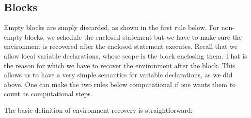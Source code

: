 \documentclass{article}
\begin{document}
\begin{kdefinition}
\begin{module}{}
\begin{kblock}[text]
 \subsection{Blocks}
Empty blocks are simply discarded, as shown in the first rule below.
For non-empty blocks, we schedule the enclosed statement but we have to
make sure the environment is recovered after the enclosed statement executes.
Recall that we allow local variable declarations, whose scope is the block
enclosing them.  That is the reason for which we have to recover the
environment after the block.  This allows us to have a very simple semantics
for variable declarations, as we did above.  One can make the two rules below
computational if one wants them to count as computational steps. \end{kblock}
\begin{kblock}[text]
 The basic definition of environment recovery is straightforward: \end{kblock}


\end{module}
\end{kdefinition}
\end{document}
